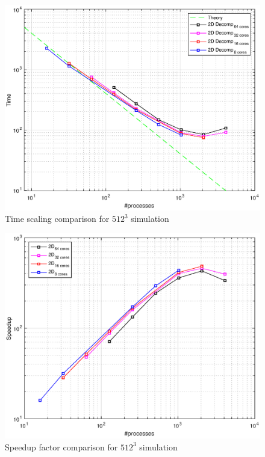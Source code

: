 \begin{figure}
\begin{center}
\includegraphics[scale=0.6]{grafici/5124}
\caption{Time scaling comparison for $512^3$ simulation}
\label{512:times}
\end{center}
\end{figure}

\begin{figure}
\begin{center}
\includegraphics[scale=0.6]{grafici/5125}
\caption{Speedup factor comparison for $512^3$ simulation}
\label{512:perf}
\end{center}
\end{figure}

